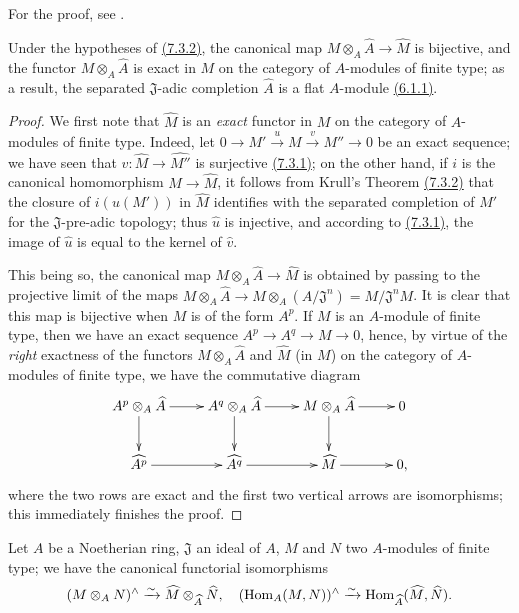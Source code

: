 For the proof, see \cite[p.~2--04]{I-1}.

\begin{cor}[7.3.3]
\label{cor-0.7.3.3}
Under the hypotheses of \hyperref[thm-0.7.3.2]{(7.3.2)}, the canonical map
$M\otimes_A\widehat{A}\to\widehat{M}$ is bijective, and the functor $M\otimes_A\widehat{A}$
is exact in $M$ on the category of $A$-modules of finite type; as a result, the separated
$\mathfrak{J}$-adic completion $\widehat{A}$ is a flat $A$-module
\hyperref[env-0.6.1.1]{(6.1.1)}.
\end{cor}

\begin{proof}
\label{proof-cor-0.7.3.3}
We first note that $\widehat{M}$ is an {\em exact} functor in $M$ on the category of
$A$-modules of finite type. Indeed, let $0\to M'\xrightarrow{u}M\xrightarrow{v}M''\to 0$ be
an exact sequence; we have seen that $\widehat{v}:\widehat{M}\to\widehat{M''}$ is surjective
\hyperref[env-0.7.3.1]{(7.3.1)}; on the other hand, if $i$ is the canonical homomorphism
$M\to\widehat{M}$, it follows from Krull's Theorem \hyperref[thm-0.7.3.2]{(7.3.2)} that the
closure of $i(u(M'))$ in $\widehat{M}$ identifies with the separated completion of $M'$ for
the $\mathfrak{J}$-pre-adic topology; thus $\widehat{u}$ is injective, and according to
\hyperref[env-0.7.3.1]{(7.3.1)}, the image of $\widehat{u}$ is equal to the kernel of
$\widehat{v}$.

This being so, the canonical map $M\otimes_A\widehat{A}\to\widehat{M}$ is obtained by passing
to the projective limit of the maps
$M\otimes_A\widehat{A}\to M\otimes_A(A/\mathfrak{J}^n)=M/\mathfrak{J}^n M$. It is clear that
this map is bijective when $M$ is of the form $A^p$. If $M$ is an $A$-module of finite type,
then we have an exact sequence $A^p\to A^q\to M\to 0$, hence, by virtue of the {\em right}
exactness of the functors $M\otimes_A\widehat{A}$ and $\widehat{M}$ (in $M$) on the category
of $A$-modules of finite type, we have the commutative diagram
\[
  \xymatrix{
    A^p\otimes_A\widehat{A}\ar[r]\ar[d] &
    A^q\otimes_A\widehat{A}\ar[r]\ar[d] &
    M\otimes_A\widehat{A}\ar[r]\ar[d] &
    0\\
    \widehat{A^p}\ar[r] &
    \widehat{A^q}\ar[r] &
    \widehat{M}\ar[r] &
    0,
  }
\]
where the two rows are exact and the first two vertical arrows are isomorphisms; this
immediately finishes the proof.
\end{proof}

\begin{cor}[7.3.4]
\label{cor-0.7.3.4}
Let $A$ be a Noetherian ring, $\mathfrak{J}$ an ideal of $A$, $M$ and $N$ two $A$-modules of
finite type; we have the canonical functorial isomorphisms
\[
  (M\otimes_A N)^\wedge\xrightarrow{\sim}\widehat{M}\otimes_{\widehat{A}}\widehat{N},
  \quad
  ({\mathop{\mathrm{Hom}}\nolimits}_A(M,N))^\wedge\xrightarrow{\sim}{\mathop{\mathrm{Hom}}\nolimits}_{\widehat{A}}(\widehat{M},\widehat{N}).
\]
\end{cor}

